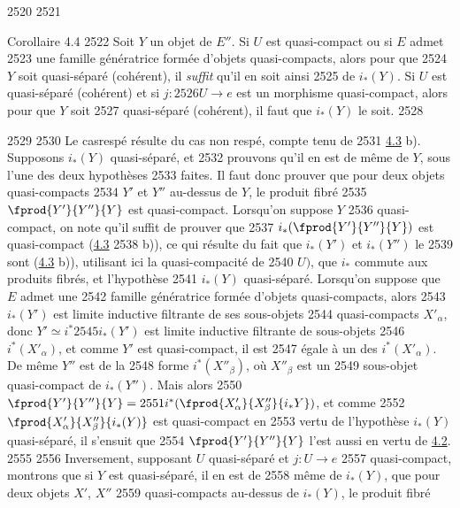   2520	
  2521	\begin{enonce*}{Corollaire 4.4}
  2522	Soit $Y$ un objet de $E''$. Si $U$ est quasi-compact ou si $E$ admet
  2523	une famille génératrice formée d'objets quasi-compacts, alors pour que
  2524	$Y$ soit quasi-séparé (\resp cohérent), il \emph{suffit} qu'il en soit ainsi
  2525	de $i_{\ast} (Y)$. Si $U$ est quasi-séparé (\resp cohérent) et si $j :
  2526	U \to e$  est un morphisme quasi-compact, alors pour que $Y$ soit
  2527	quasi-séparé (\resp cohérent), il faut que $i_{\ast}(Y)$ le soit.
  2528	\end{enonce*}
  2529	
  2530	Le cas\pageoriginale respé résulte du cas non respé, compte tenu de
  2531	\hyperref[VI.cor4.3]{4.3} b). Supposons $i_{\ast}(Y)$ quasi-séparé, et
  2532	prouvons qu'il en est de même de $Y$, sous l'une des deux hypothèses
  2533	faites. Il faut donc prouver que pour deux objets quasi-compacts
  2534	$Y'$  et $Y''$ au-dessus de $Y$, le produit fibré
  2535	$\fprod{Y'}{Y''}{Y}$ est quasi-compact. Lorsqu'on suppose $Y$
  2536	quasi-compact, on note qu'il suffit de prouver que
  2537	$i_{\ast}(\fprod{Y'}{Y''}{Y})$ est quasi-compact (\hyperref[VI.cor4.3]{4.3}
  2538	b)), ce qui résulte du fait que $i_{\ast}(Y')$ et $i_{\ast}(Y'')$ le
  2539	sont  (\hyperref[VI.cor4.3]{4.3} b)), utilisant ici la quasi-compacité de
  2540	$U)$, que $i_{\ast}$ commute aux produits fibrés, et l'hypothèse
  2541	$i_{\ast}(Y)$ quasi-séparé. Lorsqu'on suppose que $E$ admet une
  2542	famille génératrice formée d'objets quasi-compacts, alors
  2543	$i_{\ast}(Y')$ est limite inductive filtrante de ses sous-objets
  2544	quasi-compacts ${X'}_{\alpha}$, donc $Y' \simeq i^{\ast}
  2545	i_{\ast}(Y')$ est limite inductive filtrante de sous-objets
  2546	$i^{\ast}({X'}_{\alpha})$, et comme $Y'$ est quasi-compact, il est
  2547	égale à un des $i^{\ast}({X'}_{\alpha})$. De même $Y''$ est de la
  2548	forme $i^{\ast}({X''}_{\beta})$, où ${X''}_{\beta}$ est un
  2549	sous-objet quasi-compact de $i_{\ast}(Y'')$. Mais alors
  2550	$\fprod{Y'}{Y''}{Y} =
  2551	i^{\ast}(\fprod{X'_{\alpha}}{X''_{\beta}}{i_{\ast}Y})$, et comme
  2552	$\fprod{X'_{\alpha}}{X''_{\beta}}{i_{\ast}(Y)}$ est quasi-compact en
  2553	vertu de l'hypothèse $i_{\ast}(Y)$ quasi-séparé, il s'ensuit que
  2554	$\fprod{Y'}{Y''}{Y}$ l'est aussi en vertu de \hyperref[VI.prop4.2]{4.2}.
  2555	
  2556	Inversement, supposant $U$ quasi-séparé et $j : U \to e$
  2557	quasi-compact, montrons que si $Y$ est quasi-séparé, il en est de
  2558	même de $i_{\ast}(Y)$, \ie que pour deux objets $X'$, $X''$
  2559	quasi-compacts au-dessus de $i_{\ast}(Y)$, le produit fibré
